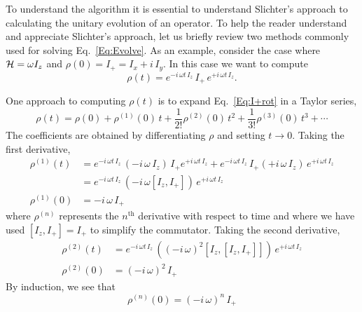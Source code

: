
To understand the  algorithm it is essential to understand Slichter's approach to calculating the unitary evolution of an operator.  To help the reader understand and appreciate Slichter's approach, let us briefly review two methods commonly used for solving Eq.~\ref{Eq:Evolve}.  As an example, consider the case where ${\cal H} = \omega I_z$ and $\rho(0) = I_{+} = I_x + i \, I_y$.  In this case we want to compute
\begin{equation}
\rho(t) 
	= e^{-i \, \omega t \, I_z} \, I_{+} \, e^{+i \, \omega t \, I_z}.
	\label{Eq:I+rot}
\end{equation}

  One approach to computing $\rho(t)$ is to expand Eq.~\ref{Eq:I+rot} in a Taylor series,
\begin{equation}
\rho(t) 
	= \rho(0) + \rho^{(1)}(0) \, t + \frac{1}{2!} \rho^{(2)}(0) \, t^2
 		+ \frac{1}{3!} \rho^{(3)}(0) \, t^3 + \cdots
\end{equation}
The coefficients are obtained by differentiating $\rho$ and setting $t \rightarrow 0$.  Taking the first derivative,
\begin{subequations}
\begin{align}
\rho^{(1)}(t) 
	& = e^{-i \, \omega t \, I_z} \,
		(-i \, \omega \, I_z) \, I_{+} 
		e^{+i \, \omega t \, I_z}
	 + e^{-i \, \omega t \, I_z} \,
		 I_{+} (+i \, \omega \, I_z) \, 
		e^{+i \, \omega t \, I_z} \\
	& = e^{-i \, \omega t \, I_z} \, 
		(-i \, \omega [I_z,I_{+}] ) 
		\, e^{+i \, \omega t \, I_z} \\
\rho^{(1)}(0) & = -i \, \omega \, I_{+}
\end{align}
\end{subequations}
where $\rho^{(n)}$ represents the $n^{\text{th}}$ derivative with respect to time and where we have used $[I_z,I_{+}] = I_{+}$ to simplify the commutator.  Taking the second derivative,
\begin{subequations}
\begin{align}
\rho^{(2)}(t) & = e^{-i \, \omega t \, I_z} \, 
	((-i \, \omega)^2 [I_z,[I_z,I_{+}]] ) 
	\, e^{+i \, \omega t \, I_z} \\
\rho^{(2)}(0) & = (-i \, \omega)^2 \, I_{+} 
\end{align}
\end{subequations}
By induction, we see that
\begin{equation}
\rho^{(n)}(0) = (-i \, \omega)^n \, I_{+}
\end{equation}
